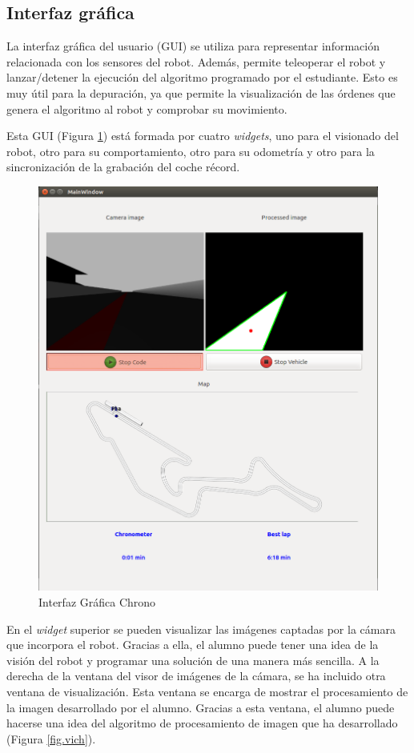 \subsection{Interfaz gráfica}
La interfaz gráfica del usuario (GUI) se utiliza para representar información relacionada con los sensores del robot. Además, permite teleoperar el robot y lanzar/detener la ejecución del algoritmo programado por el estudiante. Esto es muy útil para la depuración, ya que permite la visualización de las órdenes que genera el algoritmo al robot y comprobar su movimiento.

Esta GUI (Figura \ref{fig.guich}) está formada por cuatro \textit{widgets}, uno para el visionado del robot, otro para su comportamiento, otro para su odometría y otro para la sincronización de la grabación del coche récord.


\begin{figure}[H]
  \begin{center}
    \includegraphics[width=.75\textwidth]{figures/GUI_Chrono.png}
		\caption{Interfaz Gráfica Chrono}
		\label{fig.guich}
		\end{center}
\end{figure}

En el \textit{widget} superior se pueden visualizar las imágenes captadas por la cámara que incorpora el robot. Gracias a ella, el alumno puede tener una idea de la visión del robot y programar una solución de una manera más sencilla. A la derecha de la ventana del visor de imágenes de la cámara, se ha incluido otra ventana de visualización. Esta ventana se encarga de mostrar el procesamiento de la imagen desarrollado por el alumno. Gracias a esta ventana, el alumno puede hacerse una idea del algoritmo de procesamiento de imagen que ha desarrollado (Figura \ref{fig.vich}).

